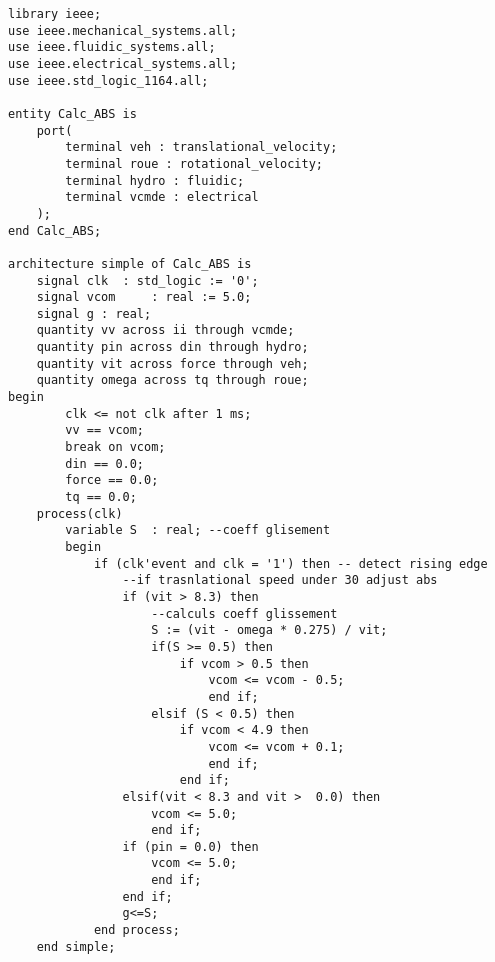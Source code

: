 \begin{verbatim}
library ieee;
use ieee.mechanical_systems.all;
use ieee.fluidic_systems.all;
use ieee.electrical_systems.all;
use ieee.std_logic_1164.all;

entity Calc_ABS is
    port(
        terminal veh : translational_velocity;
        terminal roue : rotational_velocity;
        terminal hydro : fluidic;
        terminal vcmde : electrical
    );
end Calc_ABS;

architecture simple of Calc_ABS is
	signal clk	: std_logic := '0';
	signal vcom     : real := 5.0;
	signal g : real;
	quantity vv across ii through vcmde;
	quantity pin across din through hydro;
	quantity vit across force through veh;
	quantity omega across tq through roue;
begin
        clk <= not clk after 1 ms;
        vv == vcom;  
        break on vcom; 
        din == 0.0;
        force == 0.0;
        tq == 0.0;
    process(clk)
    	variable S	: real; --coeff glisement
    	begin 
    		if (clk'event and clk = '1') then -- detect rising edge 
    			--if trasnlational speed under 30 adjust abs
    			if (vit > 8.3) then 
    			    --calculs coeff glissement
    				S := (vit - omega * 0.275) / vit; 
    				if(S >= 0.5) then 
    					if vcom > 0.5 then 
    						vcom <= vcom - 0.5;
    						end if; 
    				elsif (S < 0.5) then
    					if vcom < 4.9 then 
    						vcom <= vcom + 0.1;
    						end if;
    					end if; 
    			elsif(vit < 8.3 and vit >  0.0) then 
    				vcom <= 5.0;
    				end if;
    			if (pin = 0.0) then
    				vcom <= 5.0;
    				end if;
    			end if;
    			g<=S;
    		end process;
    end simple;
\end{verbatim}